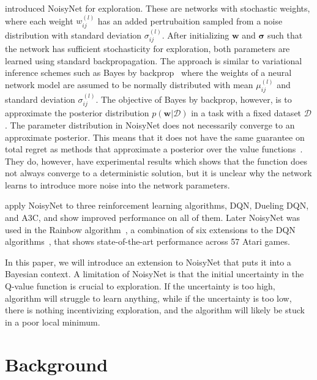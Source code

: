 \documentclass[]{uai2021} %
\begin{document}
\citet{fortunato_noisy_2019} introduced NoisyNet for exploration.
These are networks with stochastic weights, where each weight \(w^{(l)}_{ij}\)
has an added pertrubaition sampled from a noise distribution with standard deviation \(\sigma^{(l)}_{ij}\).
After initializing \(\bm{w}\) and \(\bm{\sigma}\) such that the network has sufficient
stochasticity for exploration, both parameters are learned using standard backpropagation.
The approach is similar to variational inference schemes such as Bayes by backprop~\citep{blundell_weight_2015} where the weights of a neural network model are assumed to be normally distributed with mean 
\(\mu^{(l)}_{ij}\) and standard deviation \(\sigma^{(l)}_{ij}\). The objective of
Bayes by backprop, however, is to approximate the posterior distribution
\(p(\bm{w} \vert \mathcal{D})\) in a task with a fixed dataset \(\mathcal{D}\).
The parameter distribution in NoisyNet does not necessarily
converge to an approximate posterior. This means that it does not have the same
guarantee on total regret as methods that approximate a posterior over the
value functions~\citep{osband_generalization_2016}. They do, however, have
experimental results which shows that the function does not always converge to
a deterministic solution, but it is unclear why the network learns to introduce
more noise into the network parameters.

\citet{fortunato_noisy_2019} apply NoisyNet to three reinforcement learning
algorithms, DQN, Dueling DQN, and A3C, and show improved performance on all
of them. Later NoisyNet was used in the Rainbow 
algorithm~\citep{hessel_rainbow_2017}, a combination of six extensions to the
DQN algorithms~\citep{fortunato_noisy_2019, bellemare_distributional_2017, wang_dueling_2016,van_hasselt_deep_2015,schaul_prioritized_2016,mnih_asynchronous_2016}, that shows state-of-the-art performance across 57 Atari games.

In this paper, we will introduce an extension to NoisyNet that puts it into a Bayesian context. A limitation of NoisyNet is that the initial uncertainty in the Q-value function is crucial to exploration. If the uncertainty is too high, algorithm will struggle to learn anything, while if the uncertainty is too low, there is nothing incentivizing exploration, and the algorithm will likely be stuck in a poor local minimum.

\section{Background}
\end{document}
